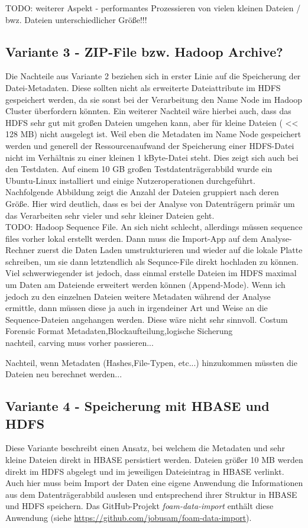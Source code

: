 \noindent
TODO: weiterer Aspekt - performantes Prozessieren von vielen kleinen Dateien / bwz. Dateien unterschiedlicher Größe!!!\\

\subsection{Variante 3 - ZIP-File bzw. Hadoop Archive?}
Die Nachteile aus Variante 2 beziehen sich in erster Linie auf die Speicherung der Datei-Metadaten. Diese sollten nicht als erweiterte Dateiattribute im HDFS gespeichert werden, da sie sonst bei der Verarbeitung den Name Node im Hadoop Cluster überfordern könnten. Ein weiterer Nachteil wäre hierbei auch, dass das HDFS sehr gut mit großen Dateien umgehen kann, aber für kleine Dateien ( << 128 MB) nicht ausgelegt ist. Weil eben die Metadaten im Name Node gespeichert werden und generell der Ressourcenaufwand der Speicherung einer HDFS-Datei nicht im Verhältnis zu einer kleinen 1 kByte-Datei steht. Dies zeigt sich auch bei den Testdaten. Auf einem 10 GB großen Testdatenträgerabbild wurde ein Ubuntu-Linux installiert und einige Nutzeroperationen durchgeführt. Nachfolgende Abbildung zeigt die Anzahl der Dateien gruppiert nach deren Größe. Hier wird deutlich, dass es bei der Analyse von Datenträgern primär um das Verarbeiten sehr vieler und sehr kleiner Dateien geht. \\
TODO: Hadoop Sequence File. An sich nicht schlecht, allerdings müssen sequence files vorher lokal erstellt werden. Dann muss die Import-App auf dem Analyse-Rechner zuerst die Daten Laden umstrukturieren und wieder auf die lokale Platte schreiben, um sie dann letztendlich als Sequnce-File direkt hochladen zu können. Viel schwerwiegender ist jedoch, dass einmal erstelle Dateien im HDFS maximal um Daten am Dateiende erweitert werden können (Append-Mode).  Wenn ich jedoch zu den einzelnen Dateien weitere Metadaten während der Analyse ermittle, dann müssen diese ja auch in irgendeiner Art und Weise an die Sequence-Dateien angehangen werden. Diese wäre nicht sehr sinnvoll. 
Costum Forensic Format
Metadaten,Blockaufteilung,logische Sicherung\\
nachteil, carving muss vorher passieren...

Nachteil, wenn Metadaten (Hashes,File-Typen, etc...) hinzukommen müssten die Dateien neu berechnet werden...

\subsection{Variante 4 - Speicherung mit HBASE und HDFS}
Diese Variante beschreibt einen Ansatz, bei welchem die Metadaten und sehr kleine Dateien direkt in HBASE persistiert werden. Dateien größer 10 MB werden direkt im HDFS abgelegt und im jeweiligen Dateieintrag in HBASE verlinkt. Auch hier muss beim Import der Daten eine eigene Anwendung die Informationen aus dem Datenträgerabbild auslesen und entsprechend ihrer Struktur in HBASE und HDFS speichern. Das GitHub-Projekt \textit{foam-data-import} enthält diese Anwendung (siehe \url{https://github.com/jobusam/foam-data-import}).\\


